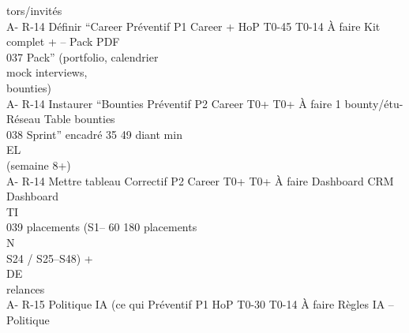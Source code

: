 tors/invités\\
A- R-14     Définir “Career      Préventif P1   Career + HoP T0-45 T0-14 À faire   Kit complet + –            Pack PDF\\
037         Pack” (portfolio,                                                      calendrier\\
mock interviews,\\
bounties)\\
A- R-14     Instaurer “Bounties Préventif P2    Career       T0+ T0+ À faire       1 bounty/étu- Réseau       Table bounties\\
038         Sprint” encadré                                  35    49              diant min\\
\vspace{0.5em}
\vspace{0.5em}
\vspace{0.5em}
\vspace{0.5em}
EL\\
(semaine 8+)\\
A- R-14     Mettre tableau       Correctif P2   Career       T0+ T0+ À faire       Dashboard       CRM        Dashboard\\
\vspace{0.5em}
\vspace{0.5em}
\vspace{0.5em}
\vspace{0.5em}
TI\\
039         placements (S1–                                  60    180             placements\\
\vspace{0.5em}
\vspace{0.5em}
\vspace{0.5em}
\vspace{0.5em}
N\\
S24 / S25–S48) +\\
\vspace{0.5em}
\vspace{0.5em}
\vspace{0.5em}
\vspace{0.5em}
DE\\
relances\\
A- R-15     Politique IA (ce qui Préventif P1   HoP          T0-30 T0-14 À faire   Règles IA       –          Politique\\
\vspace{0.5em}
\vspace{0.5em}
\vspace{0.5em}
